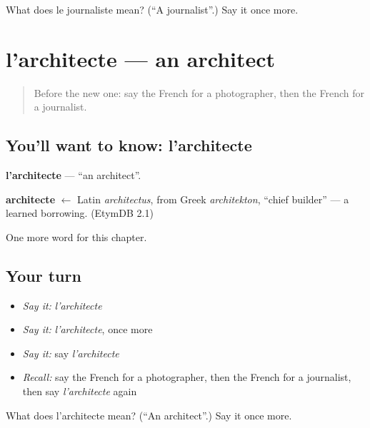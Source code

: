 \begin{tcolorbox}[breakable,colback=teal!4,colframe=teal!35!black,title={Before you move on}]
What does le journaliste mean? (\textquotedblleft{}A journalist\textquotedblright{}.) Say it once more.
\end{tcolorbox}
\section[l'architecte]{l'architecte — an architect}

\label{lesson:FR-C166-architecte}



\begin{quote}
Before the new one: say the French for a photographer, then the French for a journalist.
\end{quote}

\subsection*{You'll want to know: l'architecte}
\textbf{l'architecte} — \textquotedblleft{}an architect\textquotedblright{}.

\begin{cousinweb}
\textbf{architecte} $\leftarrow$ Latin \emph{architectus}, from Greek \emph{architekton}, \textquotedblleft{}chief builder\textquotedblright{} — a learned borrowing. (EtymDB 2.1)
\end{cousinweb}

\begin{grammarlens}[title={What you've built}]
One more word for this chapter.
\end{grammarlens}

\subsection*{Your turn}
\begin{itemize}
\raggedright
  \item \emph{Say it:} \emph{l'architecte}
  \item \emph{Say it:} \emph{l'architecte}, once more
  \item \emph{Say it:} say \emph{l'architecte}
  \item \emph{Recall:} say the French for a photographer, then the French for a journalist, then say \emph{l'architecte} again
\end{itemize}

\begin{tcolorbox}[breakable,colback=teal!4,colframe=teal!35!black,title={Before you move on}]
What does l'architecte mean? (\textquotedblleft{}An architect\textquotedblright{}.) Say it once more.
\end{tcolorbox}
